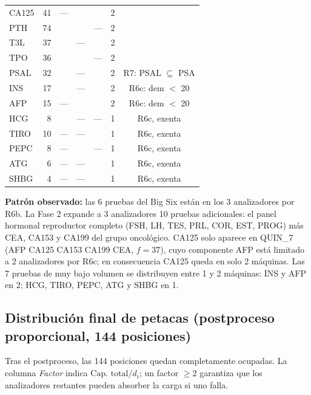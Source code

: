 \documentclass[12pt, a4paper]{article}
\newcommand{\cmark}{\ding{51}}
\begin{document}
\begin{table}[H]
\begin{tabular}{lrccccc}
CA125 &  41 & ---    & \cmark & \cmark & 2 & \\
PTH   &  74 & \cmark & \cmark & ---    & 2 & \\
T3L   &  37 & \cmark & ---    & \cmark & 2 & \\
TPO   &  36 & \cmark & \cmark & ---    & 2 & \\
PSAL  &  32 & \cmark & ---    & \cmark & 2 & R7: PSAL $\subseteq$ PSA \\
INS   &  17 & \cmark & ---    & \cmark & 2 & R6c: dem $<$ 20 \\
AFP   &  15 & ---    & \cmark & \cmark & 2 & R6c: dem $<$ 20 \\
\midrule
HCG   &   8 & \cmark & ---    & ---    & 1 & R6c, exenta \\
TIRO  &  10 & ---    & ---    & \cmark & 1 & R6c, exenta \\
PEPC  &   8 & ---    & \cmark & ---    & 1 & R6c, exenta \\
ATG   &   6 & ---    & ---    & \cmark & 1 & R6c, exenta \\
SHBG  &   4 & ---    & ---    & \cmark & 1 & R6c, exenta \\
\bottomrule
\end{tabular}
\end{table}

\textbf{Patrón observado:} las 6 pruebas del Big Six están en los 3 analizadores por R6b.
La Fase 2 expande a 3 analizadores 10 pruebas adicionales: el panel hormonal reproductor
completo (FSH, LH, TES, PRL, COR, EST, PROG) más CEA, CA153 y CA199 del grupo oncológico.
CA125 solo aparece en QUIN\_7 (AFP CA125 CA153 CA199 CEA, $f=37$), cuyo componente AFP
está limitado a 2 analizadores por R6c; en consecuencia CA125 queda en solo 2 máquinas.
Las 7 pruebas de muy bajo volumen se distribuyen entre 1 y 2 máquinas: INS y AFP en 2;
HCG, TIRO, PEPC, ATG y SHBG en 1.

\subsection{Distribución final de petacas (postproceso proporcional, 144 posiciones)}

Tras el postproceso, las 144 posiciones quedan completamente ocupadas. La columna
\emph{Factor} indica $\text{Cap. total}/d_i$; un factor $\geq 2$ garantiza que los
analizadores restantes pueden absorber la carga si uno falla.
\end{document}

